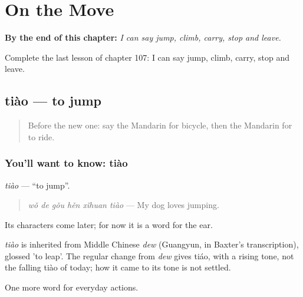 
\chapter{On the Move}
\label{ch:zh-on-the-move}

\begin{chapteropening}
\textbf{By the end of this chapter:} \emph{I can say jump, climb, carry, stop and leave.}

Complete the last lesson of chapter 107: I can say jump, climb, carry, stop and leave.
\end{chapteropening}

\section[tiào]{tiào — to jump}

\label{lesson:ZH-C107-tiao}



\begin{quote}
Before the new one: say the Mandarin for bicycle, then the Mandarin for to ride.
\end{quote}

\subsection*{You'll want to know: tiào}
\emph{tiào} — \textquotedblleft{}to jump\textquotedblright{}.

\begin{quote}
\emph{wǒ de gǒu hěn xǐhuan tiào} — My dog loves jumping.
\end{quote}

Its characters come later; for now it is a word for the ear.

\begin{cousinweb}
\emph{tiào} is inherited from Middle Chinese \emph{dew} (Guangyun, in Baxter's transcription), glossed 'to leap'. The regular change from \emph{dew} gives tiáo, with a rising tone, not the falling tiào of today; how it came to its tone is not settled.
\end{cousinweb}

\begin{grammarlens}[title={What you've built}]
One more word for everyday actions.
\end{grammarlens}

